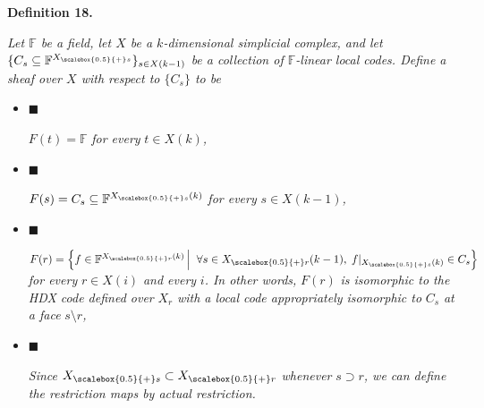 \documentclass[10pt,a4paper]{article}
\begin{document}


\par\medskip\noindent\textbf{
\textbf{Definition 18}\textbf{.}
}\par



\emph{Let $\mathbb{F}$ be a field, let $X$ be a $k$-dimensional simplicial complex, and let $\{C_{s}\subseteq\mathbb{F}^{{X}_{\scalebox{0.5}{+}s}}\}_{s\in X(k-1)}$ be a collection of $\mathbb{F}$-linear local codes. Define a sheaf over $X$ with respect to $\{C_{s}\}$ to be}\par


\begin{itemize}


\item[] 
$\blacksquare$ 


$F(t)=\mathbb{F}$\emph{ for every }$t\in X(k)$\emph{,}\par





\item[] 
$\blacksquare$ 


$F(s)=C_{s}\subseteq\mathbb{F}^{{X}_{\scalebox{0.5}{+}s}(k)}$\emph{ for every }$s\in X(k-1)$\emph{,}\par





\item[] 
$\blacksquare$ 


$F(r)=\left\{f\in\mathbb{F}^{{X}_{\scalebox{0.5}{+}r}(k)}\left|\;\vphantom{f\in\mathbb{F}^{{X}_{\scalebox{0.5}{+}r}(k)}\forall s\in{X}_{\scalebox{0.5}{+}r}(k-1),\;f|_{{X}_{\scalebox{0.5}{+}s}(k)}\in C_{s}}\right.\forall s\in{X}_{\scalebox{0.5}{+}r}(k-1),\;f|_{{X}_{\scalebox{0.5}{+}s}(k)}\in C_{s}\right\}$\emph{ for every }$r\in X(i)$\emph{ and every }$i$\emph{. In other words, }$F(r)$\emph{ is isomorphic to the HDX code defined over }$X_{r}$\emph{ with a local code appropriately isomorphic to }$C_{s}$\emph{ at a face }$s\setminus r$\emph{,}\par





\item[] 
$\blacksquare$ 


\emph{Since }${X}_{\scalebox{0.5}{+}s}\subset{X}_{\scalebox{0.5}{+}r}$\emph{ whenever }$s\supset r$\emph{, we can define the restriction maps by actual restriction.}\par





\end{itemize}
\end{document}
